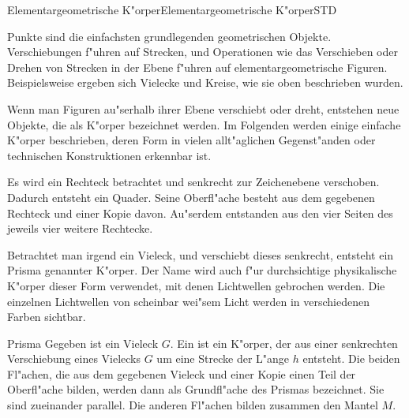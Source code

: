 \begin{MXContent}{Elementargeometrische K"orper}{Elementargeometrische K"orper}{STD}%

Punkte sind die einfachsten grundlegenden geometrischen Objekte. Verschiebungen
f"uhren auf Strecken, und Operationen wie das Verschieben oder Drehen von 
Strecken in der Ebene f"uhren auf elementargeometrische Figuren. 
Beispielsweise ergeben sich Vielecke und Kreise, wie sie oben beschrieben 
wurden.

Wenn man Figuren au"serhalb ihrer Ebene verschiebt oder dreht, entstehen neue
Objekte, die als K"orper bezeichnet werden. Im Folgenden werden einige einfache 
K"orper beschrieben, deren Form in vielen allt"aglichen Gegenst"anden oder 
technischen Konstruktionen erkennbar ist.

\begin{MExample}
Es wird ein Rechteck betrachtet und senkrecht zur Zeichenebene verschoben.
Dadurch entsteht ein Quader. Seine Oberfl"ache besteht aus dem gegebenen
Rechteck und einer Kopie davon. Au"serdem entstanden aus den vier Seiten
des jeweils vier weitere Rechtecke.
\end{MExample}

Betrachtet man irgend ein Vieleck, und verschiebt dieses senkrecht, entsteht
ein Prisma genannter K"orper. Der Name wird auch f"ur durchsichtige physikalische
K"orper dieser Form verwendet, mit denen Lichtwellen gebrochen werden. Die 
einzelnen Lichtwellen von scheinbar wei"sem Licht werden in verschiedenen Farben
sichtbar.

\begin{MXInfo}{Prisma}
Gegeben ist ein Vieleck $G$.
Ein  ist ein K"orper, der aus einer senkrechten 
Verschiebung eines Vielecks $G$ um eine Strecke der L"ange $h$ entsteht. 
Die beiden Fl"achen, die aus dem gegebenen Vieleck und einer Kopie einen 
Teil der Oberfl"ache bilden, werden dann als Grundfl"ache des Prismas 
bezeichnet. Sie sind zueinander parallel. 
Die anderen Fl"achen bilden zusammen den Mantel $M$.


\end{MXInfo}
\end{MXContent}
